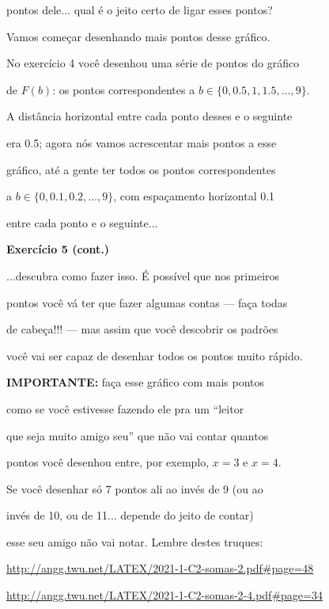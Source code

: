 \documentclass[oneside,12pt]{article}
\begin{document}
pontos dele... qual é o jeito certo de ligar esses pontos?

Vamos começar desenhando mais pontos desse gráfico.

No exercício 4 você desenhou uma série de pontos do gráfico

de $F(b)$: os pontos correspondentes a $b∈\{0, 0.5, 1, 1.5, \ldots, 9\}$.

A distância horizontal entre cada ponto desses e o seguinte

era 0.5; agora nós vamos acrescentar mais pontos a esse

gráfico, até a gente ter todos os pontos correspondentes

a $b∈\{0, 0.1, 0.2, \ldots, 9\}$, com espaçamento horizontal 0.1

entre cada ponto e o seguinte...

\newpage


{\bf Exercício 5 (cont.)}

...descubra como fazer isso. É possível que nos primeiros

pontos você vá ter que fazer algumas contas --- faça todas

de cabeça!!! --- mas assim que você descobrir os padrões

você vai ser capaz de desenhar todos os pontos muito rápido.

\msk

{\bf IMPORTANTE:} faça esse gráfico com mais pontos

como se você estivesse fazendo ele pra um ``leitor

que seja muito amigo seu'' que não vai contar quantos

pontos você desenhou entre, por exemplo, $x=3$ e $x=4$.

Se você desenhar só 7 pontos ali ao invés de 9 (ou ao

invés de 10, ou de 11... depende do jeito de contar)

esse seu amigo não vai notar. Lembre destes truques:

\ssk

{\footnotesize

\url{http://angg.twu.net/LATEX/2021-1-C2-somas-2.pdf#page=48}

\url{http://angg.twu.net/LATEX/2021-1-C2-somas-2-4.pdf#page=34}

}
\end{document}
